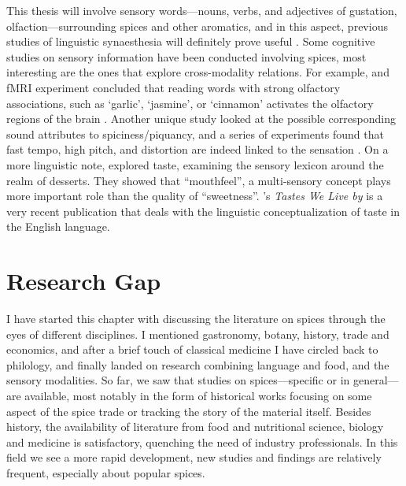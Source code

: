 This thesis will involve sensory words---nouns, verbs, and adjectives of gustation, olfaction---surrounding spices and other aromatics, and in this aspect, previous studies of linguistic synaesthesia will definitely prove useful \autocites[see][]{huang_linguistic_2019}{zhao_directionality_2019}. Some cognitive studies on sensory information have been conducted involving spices, most interesting are the ones that explore cross-modality relations. For example, and fMRI experiment concluded that reading words with strong olfactory associations, such as `garlic', `jasmine', or `cinnamon' activates the olfactory regions of the brain \autocite{gonzalez_reading_2006}. Another unique study looked at the possible corresponding sound attributes to spiciness/piquancy, and a series of experiments found that fast tempo, high pitch, and distortion are indeed linked to the sensation \autocite{wang_sounds_2017}. On a more linguistic note,  \textcite{zhong_sweetness_2020} explored taste, examining the sensory lexicon around the realm of desserts. They showed that ``mouthfeel'', a multi-sensory concept plays more important role than the quality of ``sweetness''. \textcite{bagli_tastes_2021}'s \textit{Tastes We Live by} is a very recent publication that deals with the linguistic conceptualization of taste in the English language.

\section{Research Gap}

I have started this chapter with discussing the literature on spices through the eyes of different disciplines. I mentioned gastronomy, botany, history, trade and economics, and after a brief touch of classical medicine I have circled back to philology, and finally landed on research combining language and food, and the sensory modalities. So far, we saw that studies on spices---specific or in general---are available, most notably in the form of historical works focusing on some aspect of the spice trade or tracking the story of the material itself. Besides history, the availability of literature from food and nutritional science, biology and medicine is satisfactory, quenching the need of industry professionals. In this field we see a more rapid development, new studies and findings are relatively frequent, especially about popular spices. 


